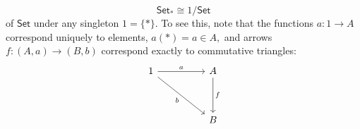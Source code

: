 \begin{equation*} 
	\mathsf{Set}_* \cong 1/\mathsf{Set}
\end{equation*}
of $\mathsf{Set}$ under any singleton $1 = \{*\}.$ To see this, note that the functions $a:1\to A$ correspond uniquely to elements, $a(*) = a \in A,$ and arrows $f:(A, a) \to (B, b)$ correspond exactly to commutative triangles:
\begin{equation*} 
	\begin{tikzcd}
1 \arrow[rr, "a"] \arrow[rrdd, "b"'] &  & A \arrow[dd, "f"] \\
                                     &  &                   \\
                                     &  & B                
\end{tikzcd}
\end{equation*}
